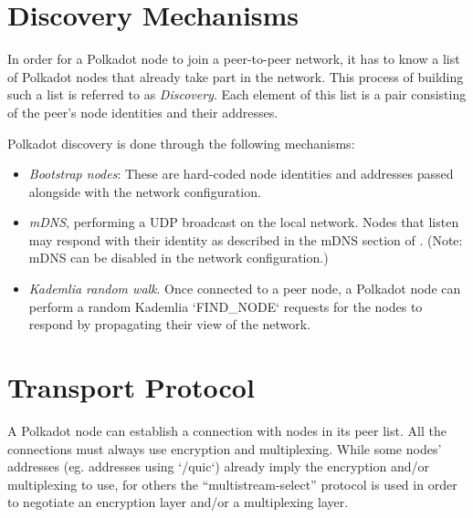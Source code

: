 \documentclass{book}
\newcommand{\tmem}[1]{{\em #1\/}}
\newcommand{\tmtextit}[1]{{\itshape{#1}}}
\providecommand{\tmem}[1]{\tmtextit{#1}}
\providecommand{\tmtextit}[1]{\tmtextit{#1}}
\begin{document}
{}

\section{Discovery Mechanisms}

In order for a Polkadot node to join a peer-to-peer network, it has to know a
list of Polkadot nodes that already take part in the network. This process of
building such a list is referred to as {\tmem{Discovery}}. Each element of
this list is a pair consisting of the peer's node identities and their
addresses.

{}

Polkadot discovery is done through the following mechanisms:
\begin{itemize}
  \item {\tmem{Bootstrap nodes}}: These are hard-coded node identities and
  addresses passed alongside with the network configuration.
  
  \item {\tmem{mDNS}}, performing a UDP broadcast on the local network. Nodes
  that listen may respond with their identity as described in the mDNS section
  of {\cite{protocol_labs_libp2p_2019}}. (Note: mDNS can be disabled in the
  network configuration.)
  
  \item {\tmem{Kademlia random walk}}. Once connected to a peer node, a
  Polkadot node can perform a random Kademlia `FIND\_NODE` requests for the
  nodes {} to respond by propagating their view of the
  network.
\end{itemize}

\section{Transport Protocol}

A Polkadot node can establish a connection with nodes in its peer list. All
the connections must always use encryption and multiplexing. While some nodes'
addresses (eg. addresses using `/quic`) already imply the encryption and/or
multiplexing to use, for others the ``multistream-select'' protocol is used in
order to negotiate an encryption layer and/or a multiplexing layer.
\end{document}
